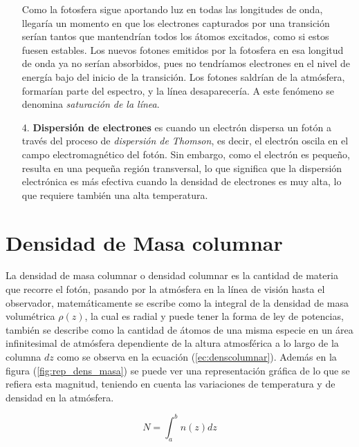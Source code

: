 \documentclass[12pt,oneside,openany,letter]{book}
\begin{document}
\begin{itemize}
    Como la fotosfera sigue aportando luz en todas las longitudes de onda, llegaría un momento en que los electrones capturados por una transición serían tantos que mantendrían todos los átomos excitados, como si estos fuesen estables. Los nuevos fotones emitidos por la fotosfera en esa longitud de onda ya no serían absorbidos, pues no tendríamos electrones en el nivel de energía bajo del inicio de la transición. Los fotones saldrían de la atmósfera, formarían parte del espectro, y la línea desaparecería. A este fenómeno se denomina \textit{saturación de la línea}.

    \item[4.] \textbf{Dispersión de electrones} es cuando un electrón dispersa un fotón a través del proceso de \textit{dispersión de Thomson}, es decir, el electrón oscila en el campo electromagnético del fotón. Sin embargo, como el electrón es pequeño, resulta en una pequeña región transversal, lo que significa que la dispersión electrónica es más efectiva cuando la densidad de electrones es muy alta, lo que requiere también una alta temperatura.
    \end{itemize}
    




\section{Densidad de Masa columnar}
La densidad de masa columnar o densidad columnar es la cantidad de materia que recorre el fotón, pasando por la atmósfera en la línea de visión hasta el observador, matemáticamente se escribe como la integral de la densidad de masa volumétrica $\rho (z)$, la cual es radial y puede tener la forma de ley de potencias, %
también se describe como la cantidad de átomos de una misma especie en un área infinitesimal de atmósfera dependiente de la altura atmosférica a lo largo de la columna $dz$ como se observa en la ecuación (\ref{ec:denscolumnar}). Además en la figura (\ref{fig:rep_dens_masa}) se puede ver una representación gráfica de lo que se refiera esta magnitud, teniendo en cuenta las variaciones de temperatura y de densidad en la atmósfera.

\begin{equation}
    N = \int_a^b n (z) dz
    \label{ec:denscolumnar}
\end{equation}
\end{document}
